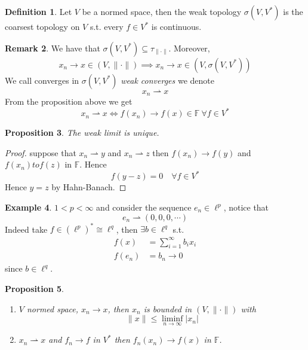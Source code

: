 \documentclass[11pt,a4paper]{article}
\theoremstyle{definition}
\newtheorem{definition}{Definition}[section]
\newtheorem{example}[definition]{Example}
\newtheorem{remark}[definition]{Remark}
\theoremstyle{plain}
\newtheorem{proposition}[definition]{Proposition}
\theoremstyle{remark}
\newcommand{\F}{\mathbb{F}}
\newcommand{\abs}[1]{\lvert #1 \rvert}
\newcommand{\norm}[1]{\lVert #1 \rVert}
\newcommand{\1}{\mathbbm{1}}
\newcommand{\wto}{\rightharpoonup}
\begin{document}
\begin{definition}
    Let $V$ be a normed space, then the weak topology $\sigma(V, V^*)$ is the coarsest topology on $V$ s.t. every $f \in V^*$ is continuous. 
\end{definition}

\begin{remark}
    We have that $\sigma(V, V^*) \subseteq \tau_{\norm{\cdot}}$. Moreover, 
    $$x_n \to x \in (V, \norm{\cdot}) \implies x_n \to x \in (V, \sigma(V, V^*))$$
    We call converges in $\sigma(V, V^*)$ \emph{weak converges} we denote 
    $$x_n \rightharpoonup x$$
    From the proposition above we get 
    $$x_n \rightharpoonup x \iff f(x_n) \to f(x) \in \F \ \forall f \in V^*$$
\end{remark}

\begin{proposition}
    The weak limit is unique.
\end{proposition}

\begin{proof}
    suppose that $x_n \wto y$ and $x_n \wto z$ then 
    $f(x_n) \to f(y)$ and $f(x_n) to f(z)$ in $\F$. Hence 
    $$f(y-z) = 0 \quad \forall f \in V^*$$
    Hence $y = z$ by Hahn-Banach.
\end{proof}

\begin{example}
    $1 < p < \infty$ and consider the sequence $e_n \in \ell^p$, notice that 
    $$e_n \wto (0,0,0,\cdots)$$
    Indeed take $f \in (\ell^p)^* \cong \ell^q$, then $\exists b \in \ell^q$ s.t. 
    \begin{align*}
        f(x) &= \sum_{i=1}^\infty b_i x_i \\
        f(e_n) &= b_n \to 0
    \end{align*}
    since $b \in \ell^q$. 
\end{example}

\begin{proposition}
    \begin{enumerate}
        \item $V$ normed space, $x_n \to x$, then $x_n$ is bounded in $(V, \norm{\cdot})$ with 
        $$\norm{x} \le \liminf_{n \to \infty} \abs{x_n}$$

        \item $x_n \wto x$ and $f_n \to f$ in $V^*$ then $f_n(x_n) \to f(x)$ in $\F$.
    \end{enumerate}
\end{proposition}
\end{document}
